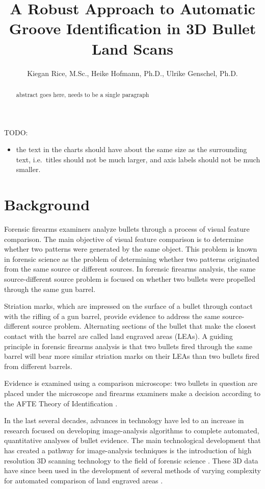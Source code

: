 \documentclass[]{article}
\title{A Robust Approach to Automatic Groove Identification in 3D Bullet Land
Scans}
\author{Kiegan Rice, M.Sc., Heike Hofmann, Ph.D., Ulrike Genschel, Ph.D.}
\date{}
\providecommand{\tightlist}{%
  \setlength{\itemsep}{0pt}\setlength{\parskip}{0pt}}
\begin{document}
\maketitle
\begin{abstract}
abstract goes here, needs to be a single paragraph
\end{abstract}

TODO:

\begin{itemize}
\tightlist
\item
  the text in the charts should have about the same size as the
  surrounding text, i.e.~titles should not be much larger, and axis
  labels should not be much smaller.
\end{itemize}

\section{Background}

Forensic firearms examiners analyze bullets through a process of visual
feature comparison. The main objective of visual feature comparison is
to determine whether two patterns were generated by the same object.
This problem is known in forensic science as the problem of determining
whether two patterns originated from the same source or different
sources. In forensic firearms analysis, the same source-different source
problem is focused on whether two bullets were propelled through the
same gun barrel.

Striation marks, which are impressed on the surface of a bullet through
contact with the rifling of a gun barrel, provide evidence to address
the same source-different source problem. Alternating sections of the
bullet that make the closest contact with the barrel are called land
engraved areas (LEAs). A guiding principle in forensic firearms analysis
is that two bullets fired through the same barrel will bear more similar
striation marks on their LEAs than two bullets fired from different
barrels.

Evidence is examined using a comparison microscope: two bullets in
question are placed under the microscope and firearms examiners make a
decision according to the AFTE Theory of Identification \citep{AFTE}.

In the last several decades, advances in technology have led to an
increase in research focused on developing image-analysis algorithms to
complete automated, quantitative analyses of bullet evidence. The main
technological development that has created a pathway for image-analysis
techniques is the introduction of high resolution 3D scanning technology
to the field of forensic science
\citep[e.g.][]{DeKinder1, DeKinder2, Bachrach1}. These 3D data have
since been used in the development of several methods of varying
complexity for automated comparison of land engraved areas
\citep[e.g.][]{Ma1, Chu1, Chu2, Hare1}.
\end{document}

